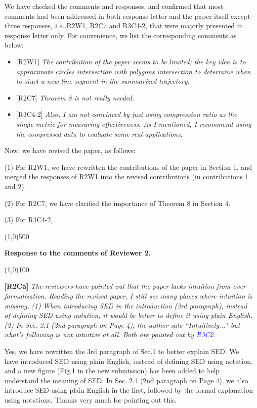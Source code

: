 \documentclass{letter}
\newcommand{\ie}{\emph{i.e.,}\xspace}
\begin{document}
We have checked the comments and responses, and confirmed that most comments had been addressed in both response letter and the paper itself except three responses, \ie {R2W1}, {R2C7} and {R3C4-2}, that were majorly presented in response letter only. For convenience, we list the corresponding comments as below:
\begin{itemize}
  \item {{[R2W1]} \emph{The contribution of the paper seems to be limited; the key idea is to approximate circles intersection with polygons intersection to determine when to start a new line segment in the summarized trajectory.}}
  \item {{[R2C7]} \emph{Theorem 8 is not really needed.}}
  \item {{[R3C4-2]} \emph{Also, I am not convinced by just using compression ratio as the single metric for measuring effectiveness. As I mentioned, I recommend using the compressed data to evaluate some real applications.}
}
\end{itemize}

Now, we have revised the paper, as follows:

(1) For {R2W1}, we have rewritten the contributions of the paper in Section 1, and merged the responses of {R2W1} into the revised contributions (in contributions 1 and 2).

(2) For {R2C7}, we have clarified the importance of Theorem 8 in Section 4.

(3) For {R3C4-2},







\line(1,0){500}

\textbf{Response to the comments of Reviewer 2.}

\line(1,0){100}


\textbf{[R2Ca]} \emph{The reviewers have pointed out that the paper lacks intuition from over-formalization. Reading the revised paper, I still see many places where intuition is missing.}
\emph{(1) When introducing SED in the introduction (3rd paragraph), instead of defining SED using notation, it would be better to define it using plain English.}
\emph{(2) In Sec. 2.1 (2nd paragraph on Page 4), the author sate ``Intuitively..." but what's following is not intuitive at all.}
\emph{Both are pointed out by \textcolor{blue}{R3C2}.}

Yes, we have rewritten the 3rd paragraph of Sec.1 to better explain SED. We have introduced SED using plain English, instead of defining SED using notation, and a new figure (Fig.1 in the new submission) has been added to help understand the meaning of SED.
{In Sec. 2.1 (2nd paragraph on Page 4), we also introduce SED using plain English in the first, followed by the formal explanation using notations.}
Thanks very much for pointing out this.
\end{document}
